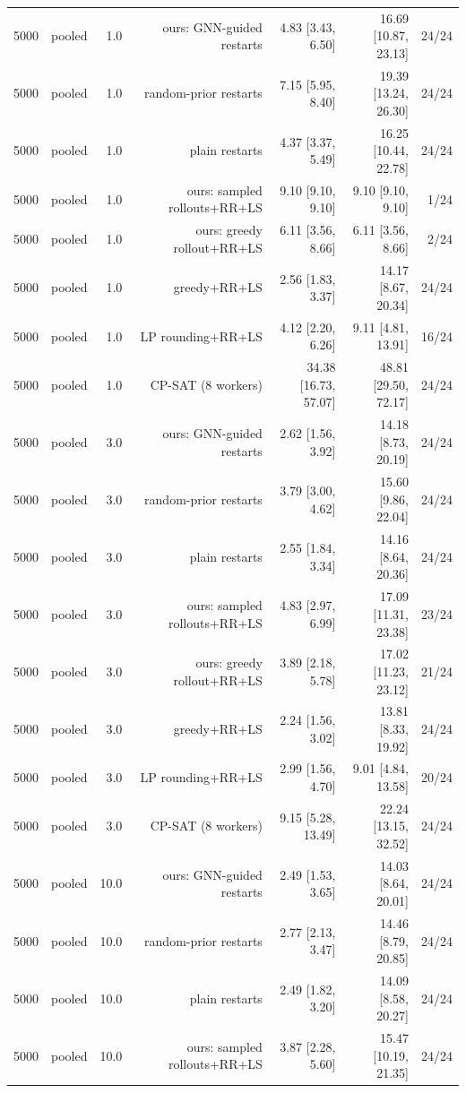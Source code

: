 \begin{table}[t]
\begin{tabular}{llrrrrr}
5000 & pooled & 1.0 & ours: GNN-guided restarts & 4.83 [3.43, 6.50] & 16.69 [10.87, 23.13] & 24/24 \\
5000 & pooled & 1.0 & random-prior restarts & 7.15 [5.95, 8.40] & 19.39 [13.24, 26.30] & 24/24 \\
5000 & pooled & 1.0 & plain restarts & 4.37 [3.37, 5.49] & 16.25 [10.44, 22.78] & 24/24 \\
5000 & pooled & 1.0 & ours: sampled rollouts+RR+LS & 9.10 [9.10, 9.10] & 9.10 [9.10, 9.10] & 1/24 \\
5000 & pooled & 1.0 & ours: greedy rollout+RR+LS & 6.11 [3.56, 8.66] & 6.11 [3.56, 8.66] & 2/24 \\
5000 & pooled & 1.0 & greedy+RR+LS & 2.56 [1.83, 3.37] & 14.17 [8.67, 20.34] & 24/24 \\
5000 & pooled & 1.0 & LP rounding+RR+LS & 4.12 [2.20, 6.26] & 9.11 [4.81, 13.91] & 16/24 \\
5000 & pooled & 1.0 & CP-SAT (8 workers) & 34.38 [16.73, 57.07] & 48.81 [29.50, 72.17] & 24/24 \\
5000 & pooled & 3.0 & ours: GNN-guided restarts & 2.62 [1.56, 3.92] & 14.18 [8.73, 20.19] & 24/24 \\
5000 & pooled & 3.0 & random-prior restarts & 3.79 [3.00, 4.62] & 15.60 [9.86, 22.04] & 24/24 \\
5000 & pooled & 3.0 & plain restarts & 2.55 [1.84, 3.34] & 14.16 [8.64, 20.36] & 24/24 \\
5000 & pooled & 3.0 & ours: sampled rollouts+RR+LS & 4.83 [2.97, 6.99] & 17.09 [11.31, 23.38] & 23/24 \\
5000 & pooled & 3.0 & ours: greedy rollout+RR+LS & 3.89 [2.18, 5.78] & 17.02 [11.23, 23.12] & 21/24 \\
5000 & pooled & 3.0 & greedy+RR+LS & 2.24 [1.56, 3.02] & 13.81 [8.33, 19.92] & 24/24 \\
5000 & pooled & 3.0 & LP rounding+RR+LS & 2.99 [1.56, 4.70] & 9.01 [4.84, 13.58] & 20/24 \\
5000 & pooled & 3.0 & CP-SAT (8 workers) & 9.15 [5.28, 13.49] & 22.24 [13.15, 32.52] & 24/24 \\
5000 & pooled & 10.0 & ours: GNN-guided restarts & 2.49 [1.53, 3.65] & 14.03 [8.64, 20.01] & 24/24 \\
5000 & pooled & 10.0 & random-prior restarts & 2.77 [2.13, 3.47] & 14.46 [8.79, 20.85] & 24/24 \\
5000 & pooled & 10.0 & plain restarts & 2.49 [1.82, 3.20] & 14.09 [8.58, 20.27] & 24/24 \\
5000 & pooled & 10.0 & ours: sampled rollouts+RR+LS & 3.87 [2.28, 5.60] & 15.47 [10.19, 21.35] & 24/24 \\

\end{tabular}
\end{table}
